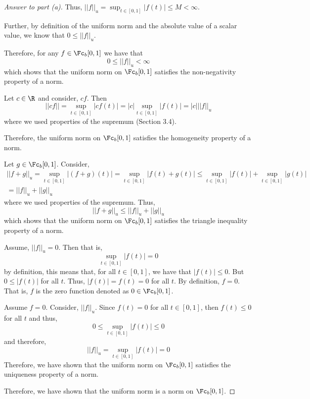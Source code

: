 \documentclass[10pt,twoside]{article}
\begin{document}
\begin{itemize}
\begin{itemize}
\begin{proof}[Answer to part (a)]
        Thus, $||f||_u = \displaystyle\sup_{t\in[0,1]}|f(t)| \leq M<\infty$.
        
        Further, by definition of the uniform norm and the absolute value of a scalar value, we know that $0\leq ||f||_u$.
        
        Therefore, for any $f\in\Fc_b[0,1]$ we have that 
        \[0\leq ||f||_u<\infty\]
        which shows that the uniform norm on $\Fc_b[0,1]$ satisfies the non-negativity property of a norm.\smallskip
        
        Let $c\in\R$ and consider, $cf$. Then $$||cf|| = \displaystyle\sup_{t\in[0,1]}|cf(t)| = |c|\displaystyle\sup_{t\in[0,1]}|f(t)| = |c|||f||_u$$ where we used properties of the supremum (Section 3.4).
        
        Therefore, the uniform norm on $\Fc_b[0,1]$ satisfies the homogeneity property of a norm.\smallskip
        
        Let $g\in\Fc_b[0,1]$. Consider, \begin{gather*}
             ||f + g||_u = \sup_{t\in[0,1]}|(f+g)(t)| = \sup_{t\in[0,1]}|f(t)+g(t)| \leq \sup_{t\in[0,1]}|f(t)| + \sup_{t\in[0,1]}|g(t)| \\
             = ||f||_u + ||g||_u
        \end{gather*}
        where we used properties of the supremum. Thus,
        \[||f + g||_u\leq ||f||_u + ||g||_u\]
        which shows that the uniform norm on $\Fc_b[0,1]$ satisfies the triangle inequality property of a norm.\smallskip
        
        Assume, $||f||_u = 0$. Then that is, 
        \[\sup_{t\in[0,1]}|f(t)| = 0\]
        by definition, this means that, for all $t\in[0,1]$, we have that $|f(t)|\leq0$. But $0\leq |f(t)|$ for all $t$. Thus, $|f(t)| = f(t) = 0$ for all $t$. By definition, $f = 0$. That is, $f$ is the zero function denoted as $0\in\Fc_b[0,1]$.\smallskip
        
        Assume $f = 0$. Consider, $||f||_u$. Since $f(t) = 0$ for all $t\in[0,1]$, then $f(t)\leq 0$ for all $t$ and thus,
        \[0 \leq \sup_{t\in[0,1]}|f(t)| \leq 0\]
        and therefore, 
        \[||f||_u = \sup_{t\in[0,1]}|f(t)| = 0\]
        Therefore, we have shown that the uniform norm on $\Fc_b[0,1]$ satisfies the uniqueness property of a norm.\medskip
        
        Therefore, we have shown that the uniform norm is a norm on $\Fc_b[0,1]$.
        
        \end{proof}
        

\end{itemize}
\end{itemize}
\end{document}
